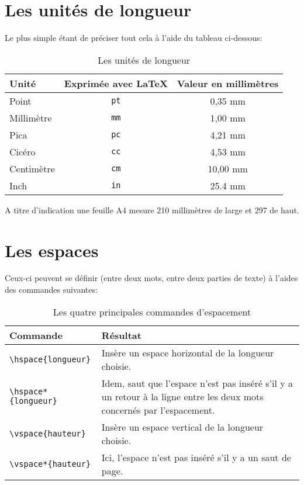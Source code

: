 \documentclass[a4paper,11pt]{book}
\begin{document}
\section{Les unités de longueur}
Le plus simple étant de préciser tout cela à l'aide du tableau ci-dessous:
\begin{table}[!h]
\begin{center}
\begin{tabular}{|l|c|c|}
\hline
\textbf{Unité} & \textbf{Exprimée avec \LaTeX{}} & \textbf{Valeur en millimètres} \\
\hline
Point & \texttt{pt} & 0,35 mm \\
\hline
Millimètre & \texttt{mm} & 1,00 mm \\
\hline
Pica & \texttt{pc} & 4,21 mm \\
\hline
Cicéro & \texttt{cc} & 4,53 mm \\
\hline
Centimètre & \texttt{cm} & 10,00 mm \\
\hline
Inch & \texttt{in} & 25.4 mm \\
\hline
\end{tabular}
\caption{Les unités de longueur}
\end{center}
\end{table}
\medskip

A titre d'indication une feuille A4 mesure 210 millimètres de large et 297 de haut.
\medskip

\section{Les espaces}
Ceux-ci peuvent se définir (entre deux mots, entre deux parties de texte) à l'aides des commandes suivantes:
\begin{table}[!h]
\begin{center}
\begin{tabular}{|p{3.5cm}|p{8.5cm}|}
\hline
\textbf{Commande} & \textbf{Résultat} \\
\hline
\verb|\hspace{longueur}| & Insère un espace horizontal de la longueur choisie. \\
\hline
\verb|\hspace*{longueur}| & Idem, saut que l'espace n'est pas inséré s'il y a un retour à la ligne entre les deux mots concernés par l'espacement. \\
\hline
\verb|\vspace{hauteur}| & Insère un espace vertical de la longueur choisie. \\
\hline
\verb|\vspace*{hauteur}| & Ici, l'espace n'est pas inséré s'il y a un saut de page. \\
\hline
\end{tabular}
\caption{Les quatre principales commandes d'espacement}
\end{center}
\end{table}
\medskip
\end{document}
